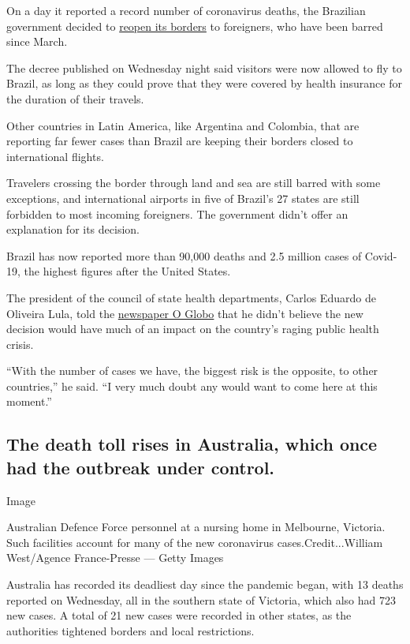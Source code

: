 On a day it reported a record number of coronavirus deaths, the
Brazilian government decided to
\href{http://www.in.gov.br/en/web/dou/-/portaria-cc-pr/mjsp/minfra/ms-n-1-de-29-de-julho-de-2020-269235614}{reopen
its borders} to foreigners, who have been barred since March.

The decree published on Wednesday night said visitors were now allowed
to fly to Brazil, as long as they could prove that they were covered by
health insurance for the duration of their travels.

Other countries in Latin America, like Argentina and Colombia, that are
reporting far fewer cases than Brazil are keeping their borders closed
to international flights.

Travelers crossing the border through land and sea are still barred with
some exceptions, and international airports in five of Brazil's 27
states are still forbidden to most incoming foreigners. The government
didn't offer an explanation for its decision.

Brazil has now reported more than 90,000 deaths and 2.5 million cases of
Covid-19, the highest figures after the United States.

The president of the council of state health departments, Carlos Eduardo
de Oliveira Lula, told the
\href{https://oglobo.globo.com/sociedade/coronavirus/governo-decide-reabrir-fronteiras-aereas-para-turistas-24557302}{newspaper
O Globo} that he didn't believe the new decision would have much of an
impact on the country's raging public health crisis.

``With the number of cases we have, the biggest risk is the opposite, to
other countries,'' he said. ``I very much doubt any would want to come
here at this moment.''

\hypertarget{the-death-toll-rises-in-australia-which-once-had-the-outbreak-under-control}{%
\subsection{The death toll rises in Australia, which once had the
outbreak under
control.}\label{the-death-toll-rises-in-australia-which-once-had-the-outbreak-under-control}}

Image

Australian Defence Force personnel at a nursing home in Melbourne,
Victoria. Such facilities account for many of the new coronavirus
cases.Credit...William West/Agence France-Presse --- Getty Images

Australia has recorded its deadliest day since the pandemic began, with
13 deaths reported on Wednesday, all in the southern state of Victoria,
which also had 723 new cases. A total of 21 new cases were recorded in
other states, as the authorities tightened borders and local
restrictions.


